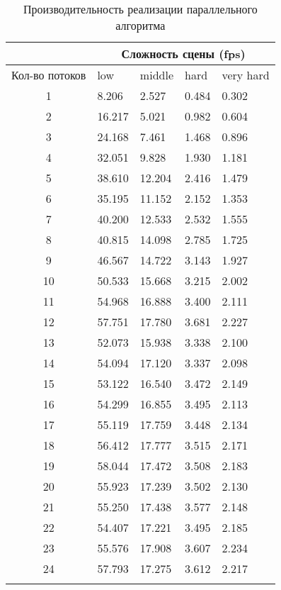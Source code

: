 \begin{center}
\begin{longtable}{|c|p{2cm}|p{2cm}|p{2cm}|p{2cm}|}
\hline & \multicolumn{4}{c|}{Сложность сцены (fps)} \\ 
\hline Кол-во потоков & low & middle & hard &  very hard\\ 
\hline 1 &  8.206 & 2.527 & 0.484 & 0.302 \\ 
\hline 2 &  16.217 & 5.021 & 0.982 & 0.604 \\ 
\hline 3 &  24.168 & 7.461 & 1.468 & 0.896 \\ 
\hline 4 &  32.051 & 9.828 & 1.930 & 1.181 \\ 
\hline 5 &  38.610 & 12.204 & 2.416 & 1.479 \\ 
\hline 6 &  35.195 & 11.152 & 2.152 & 1.353 \\ 
\hline 7 &  40.200 & 12.533 & 2.532 & 1.555 \\ 
\hline 8 &  40.815 & 14.098 & 2.785 & 1.725 \\ 
\hline 9 &  46.567 & 14.722 & 3.143 & 1.927 \\ 
\hline 10 &  50.533 & 15.668 & 3.215 & 2.002 \\ 
\hline 11 &  54.968 & 16.888 & 3.400 & 2.111 \\ 
\hline 12 &  57.751 & 17.780 & 3.681 & 2.227 \\ 
\hline 13 &  52.073 & 15.938 & 3.338 & 2.100 \\ 
\hline 14 &  54.094 & 17.120 & 3.337 & 2.098 \\ 
\hline 15 &  53.122 & 16.540 & 3.472 & 2.149 \\ 
\hline 16 &  54.299 & 16.855 & 3.495 & 2.113 \\ 
\hline 17 &  55.119 & 17.759 & 3.448 & 2.134 \\ 
\hline 18 &  56.412 & 17.777 & 3.515 & 2.171 \\ 
\hline 19 &  58.044 & 17.472 & 3.508 & 2.183 \\ 
\hline 20 &  55.923 & 17.239 & 3.502 & 2.130 \\ 
\hline 21 &  55.250 & 17.438 & 3.577 & 2.148 \\ 
\hline 22 &  54.407 & 17.221 & 3.495 & 2.185 \\ 
\hline 23 &  55.576 & 17.908 & 3.607 & 2.234 \\ 
\hline 24 &  57.793 & 17.275 & 3.612 & 2.217 \\ 
\hline
\caption{Производительность реализации параллельного алгоритма}\label{tab:perf_parallel_alg}\end{longtable}
\end{center}

